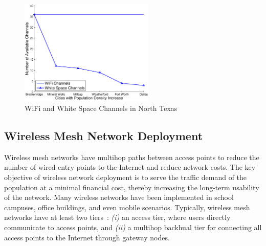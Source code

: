 \begin{figure}
\vspace{-0.0in}
\centering
\includegraphics[width=64mm]{figures/wschannels}
\vspace{-0.1in}
\caption{WiFi and White Space Channels in North Texas}
\label{fig:wschannels}
\vspace{-0.3in}
\end{figure}


\subsection{Wireless Mesh Network Deployment} 






Wireless mesh networks have multihop paths between access points to reduce the number of wired entry points 
to the Internet and reduce network costs. 
The key objective of wireless network deployment is 
to serve the traffic demand of the population at a minimal financial cost, thereby increasing the long-term 
usability of the network. 
Many wireless networks have been implemented 
in school campuses, office buildings, and even mobile scenarios. Typically, wireless mesh networks 
have at least two tiers~\cite{CRSK06}: {\it (i)} an access tier, where users directly communicate to 
access points, and {\it (ii)} a multihop backhual tier for connecting all access points to the 
Internet through gateway nodes. 

